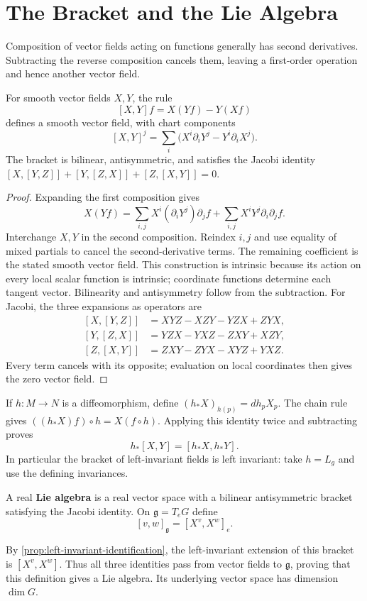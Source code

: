\section{The Bracket and the Lie Algebra}
Composition of vector fields acting on functions generally has second
derivatives. Subtracting the reverse composition cancels them, leaving a
first-order operation and hence another vector field.
\begin{proposition}\label{prop:vector-field-bracket}
For smooth vector fields $X,Y$, the rule
\[
[X,Y]f=X(Yf)-Y(Xf)
\]
defines a smooth vector field, with chart components
\[
[X,Y]^j=\sum_i\bigl(X^i\partial_iY^j-Y^i\partial_iX^j\bigr).
\]
The bracket is bilinear, antisymmetric, and satisfies the Jacobi identity
$[X,[Y,Z]]+[Y,[Z,X]]+[Z,[X,Y]]=0$.
\end{proposition}
\begin{proof}
Expanding the first composition gives
\[
X(Yf)=\sum_{i,j}X^i(\partial_iY^j)\partial_jf
+\sum_{i,j}X^iY^j\partial_i\partial_jf.
\]
Interchange $X,Y$ in the second composition. Reindex $i,j$ and use equality
of mixed partials to cancel the second-derivative terms. The remaining
coefficient is the stated smooth vector field. This construction is
intrinsic because its action on every local scalar function is intrinsic;
coordinate functions determine each tangent vector. Bilinearity and
antisymmetry follow from the subtraction. For Jacobi, the three expansions
as operators are
\[
\begin{aligned}
[X,[Y,Z]]&=XYZ-XZY-YZX+ZYX,\\
[Y,[Z,X]]&=YZX-YXZ-ZXY+XZY,\\
[Z,[X,Y]]&=ZXY-ZYX-XYZ+YXZ.
\end{aligned}
\]
Every term cancels with its opposite; evaluation on local coordinates
then gives the zero vector field.
\end{proof}
If $h:M\to N$ is a diffeomorphism, define
$(h_*X)_{h(p)}=dh_pX_p$. The chain rule gives
$((h_*X)f)\circ h=X(f\circ h)$. Applying this identity twice and
subtracting proves
\[
h_*[X,Y]=[h_*X,h_*Y].
\]
In particular the bracket of left-invariant fields is left invariant:
take $h=L_g$ and use the defining invariances.

\begin{definition}
A real \textbf{Lie algebra} is a real vector space with a bilinear
antisymmetric bracket satisfying the Jacobi identity. On $\mathfrak g=T_eG$
define
\[
[v,w]_{\mathfrak g}=[X^v,X^w]_e.
\]
\end{definition}
By \cref{prop:left-invariant-identification}, the left-invariant extension
of this bracket is $[X^v,X^w]$. Thus all three identities pass from vector
fields to $\mathfrak g$, proving that this definition gives a Lie algebra.
Its underlying vector space has dimension $\dim G$.

